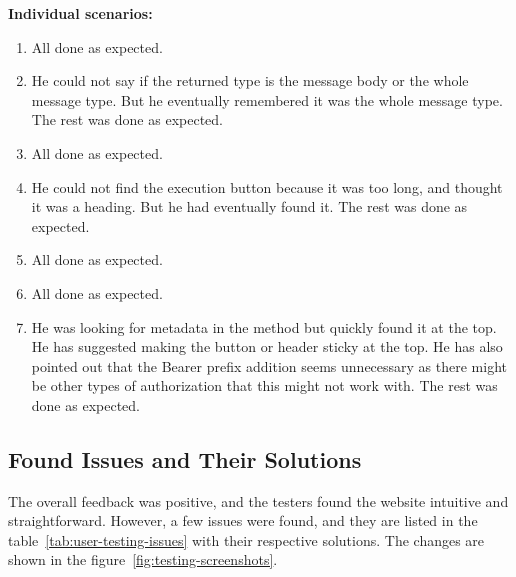\textbf{Individual scenarios:}
\begin{enumerate}
    \item All done as expected.
    \item He could not say if the returned type is the message body or the whole message type.
    But he eventually remembered it was the whole message type.
    The rest was done as expected.
    \item All done as expected.
    \item He could not find the execution button because it was too long, and thought it was a heading.
    But he had eventually found it.
    The rest was done as expected.
    \item All done as expected.
    \item All done as expected.
    \item He was looking for metadata in the method but quickly found it at the top.
    He has suggested making the button or header sticky at the top.
    He has also pointed out that the Bearer prefix addition seems unnecessary as there might be other types of authorization that this might not work with.
    The rest was done as expected.
\end{enumerate}

\subsection{Found Issues and Their Solutions}\label{subsec:found-issues-and-their-solutions}
The overall feedback was positive, and the testers found the website intuitive and straightforward.
However, a few issues were found, and they are listed in the table~\ref{tab:user-testing-issues} with their respective solutions.
The changes are shown in the figure~\ref{fig:testing-screenshots}.

\newpage

